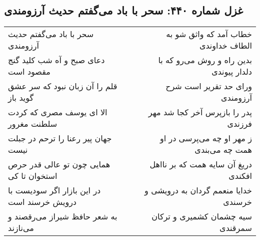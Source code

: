 \begin{center}
\section*{غزل شماره ۴۴۰: سحر با باد می‌گفتم حدیث آرزومندی}
\label{sec:sh440}
\begin{longtable}{l p{0.5cm} r}
سحر با باد می‌گفتم حدیث آرزومندی
&&
خطاب آمد که واثق شو به الطاف خداوندی
\\
دعای صبح و آه شب کلید گنج مقصود است
&&
بدین راه و روش می‌رو که با دلدار پیوندی
\\
قلم را آن زبان نبود که سر عشق گوید باز
&&
ورای حد تقریر است شرح آرزومندی
\\
الا ای یوسف مصری که کردت سلطنت مغرور
&&
پدر را بازپرس آخر کجا شد مهر فرزندی
\\
جهان پیر رعنا را ترحم در جبلت نیست
&&
ز مهر او چه می‌پرسی در او همت چه می‌بندی
\\
همایی چون تو عالی قدر حرص استخوان تا کی
&&
دریغ آن سایه همت که بر نااهل افکندی
\\
در این بازار اگر سودیست با درویش خرسند است
&&
خدایا منعمم گردان به درویشی و خرسندی
\\
به شعر حافظ شیراز می‌رقصند و می‌نازند
&&
سیه چشمان کشمیری و ترکان سمرقندی
\\
\end{longtable}
\end{center}
